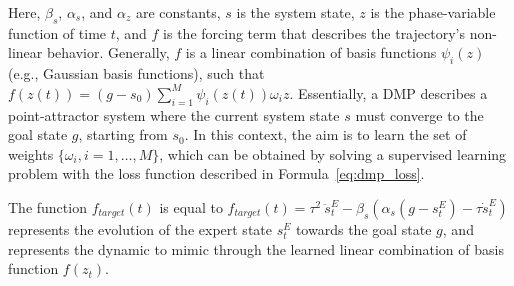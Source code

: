 Here, $\beta_{s}$, $\alpha_{s}$, and $\alpha_{z}$ are constants, $s$ is the system state, $z$ is the phase-variable function of time $t$, and $f$ is the forcing term that describes the trajectory's non-linear behavior. Generally, $f$ is a linear combination of basis functions $\psi_{i}(z)$ (e.g., Gaussian basis functions), such that $f(z(t)) = (g - s_{0}) \sum_{i=1}^{M} \psi_{i}(z(t)) \omega_{i} z$. Essentially, a DMP describes a point-attractor system where the current system state $s$ must converge to the goal state $g$, starting from $s_{0}$. In this context, the aim is to learn the set of weights $\{\omega_{i}, i=1,\dots,M\}$, which can be obtained by solving a supervised learning problem with the loss function described in Formula~\ref{eq:dmp_loss}.

The function $f_{target}(t)$ is equal to $f_{target}(t) = \tau^{2} \ \ddot{s}^{E}_{t} - \beta_{s}(\alpha_{s}(g - s^{E}_{t})-\tau \dot{s}^{E}_{t})$ represents the evolution of the expert state $s^{E}_{t}$ towards the goal state $g$, and represents the dynamic to mimic through the learned linear combination of basis function $f(z_{t})$. 

